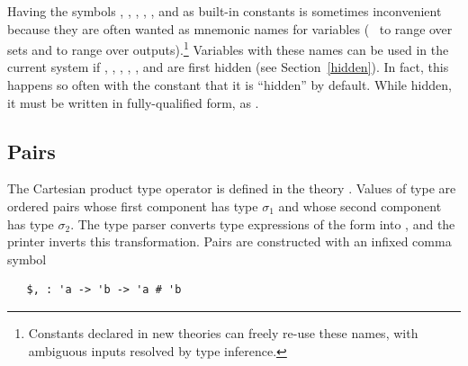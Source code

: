 Having the symbols , , , , , and 
as built-in constants
%
%
is sometimes inconvenient because they are often wanted as mnemonic
names for variables (\eg\  to range over sets and  to
range over outputs).\footnote{Constants declared in new theories can
  freely re-use these names, with ambiguous inputs resolved by type
  inference.}  Variables with these names can be used in the current
system if , , , , , and  are first
hidden (see Section~\ref{hidden}).  In fact, this happens so often
with the constant  that it is ``hidden'' by default.  While
hidden, it must be written in fully-qualified form, as
.
%


\subsection{Pairs}\label{prod}

%
The Cartesian  product  type  operator
%
%
%
%
is defined in the theory . Values of type
 are ordered pairs whose first
component has type $\sigma_1$ and whose second component has type
$\sigma_2$.  The \HOL{} type parser
%
%
converts type expressions of the form 
%
%
into ,
%
%
and the printer inverts this transformation. Pairs
%
%
are constructed with an infixed comma symbol

\begin{hol}
\begin{verbatim}
   $, : 'a -> 'b -> 'a # 'b
\end{verbatim}
\end{hol}

